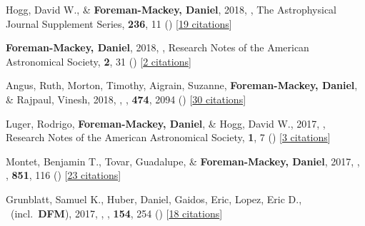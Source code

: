 \item[{\color{numcolor}\scriptsize34}] Hogg, David W., \& \textbf{Foreman-Mackey, Daniel}, 2018, , The Astrophysical Journal Supplement Series, \textbf{236}, 11 () [\href{http://adsabs.harvard.edu/abs/2018ApJS..236...11H}{19 citations}]

\item[{\color{numcolor}\scriptsize33}] \textbf{Foreman-Mackey, Daniel}, 2018, , Research Notes of the American Astronomical Society, \textbf{2}, 31 () [\href{http://adsabs.harvard.edu/abs/2018RNAAS...2a..31F}{2 citations}]

\item[{\color{numcolor}\scriptsize32}] Angus, Ruth, Morton, Timothy, Aigrain, Suzanne, \textbf{Foreman-Mackey, Daniel}, \& Rajpaul, Vinesh, 2018, , \mnras, \textbf{474}, 2094 () [\href{http://adsabs.harvard.edu/abs/2018MNRAS.474.2094A}{30 citations}]

\item[{\color{numcolor}\scriptsize31}] Luger, Rodrigo, \textbf{Foreman-Mackey, Daniel}, \& Hogg, David W., 2017, , Research Notes of the American Astronomical Society, \textbf{1}, 7 () [\href{http://adsabs.harvard.edu/abs/2017RNAAS...1a...7L}{3 citations}]

\item[{\color{numcolor}\scriptsize30}] Montet, Benjamin T., Tovar, Guadalupe, \& \textbf{Foreman-Mackey, Daniel}, 2017, , \apj, \textbf{851}, 116 () [\href{http://adsabs.harvard.edu/abs/2017ApJ...851..116M}{23 citations}]

\item[{\color{numcolor}\scriptsize29}] Grunblatt, Samuel K., Huber, Daniel, Gaidos, Eric, Lopez, Eric D., \etal\ (incl.\ \textbf{DFM}), 2017, , \aj, \textbf{154}, 254 () [\href{http://adsabs.harvard.edu/abs/2017AJ....154..254G}{18 citations}]

